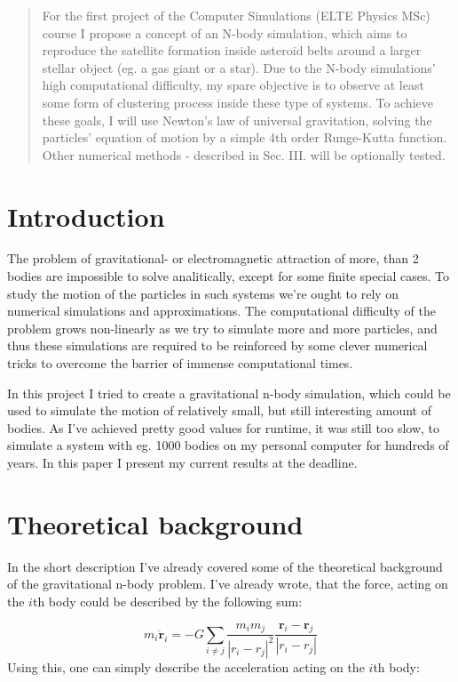 \begin{abstract}
    \noindent For the first project of the Computer Simulations (ELTE Physics MSc) course I propose a concept of an N-body simulation, which aims to reproduce the satellite formation inside asteroid belts around a larger stellar object (eg. a gas giant or a star). Due to the N-body simulations' high computational difficulty, my spare objective is to observe at least some form of clustering process inside these type of systems. To achieve these goals, I will use Newton's law of universal gravitation, solving the particles' equation of motion by a simple 4th order Runge-Kutta function. Other numerical methods - described in Sec. III. will be optionally tested.
\end{abstract}

\begin{multicols}{2}
\section{Introduction}
The problem of gravitational- or electromagnetic attraction of more, than 2 bodies are impossible to solve analitically, except for some finite special cases. To study the motion of the particles in such systems we're ought to rely on numerical simulations and approximations. The computational difficulty of the problem grows non-linearly as we try to simulate more and more particles, and thus these simulations are required to be reinforced by some clever numerical tricks to overcome the barrier of immense computational times. \par
In this project I tried to create a gravitational n-body simulation, which could be used to simulate the motion of relatively small, but still interesting amount of bodies. As I've achieved pretty good values for runtime, it was still too slow, to simulate a system with eg. 1000 bodies on my personal computer for hundreds of years. In this paper I present my current results at the deadline.

\section{Theoretical background}
In the short description I've already covered some of the theoretical background of the gravitational n-body problem. I've already wrote, that the force, acting on the $i$th body could be described by the following sum:

\begin{equation} \label{eq:1}
m_{i} \boldsymbol{\ddot{r}}_{i}
=
- G \sum_{i \neq j} \frac{m_{i} m_{j}}{\left| r_{i} - r_{j} \right|^{2}} \frac{\boldsymbol{r}_{i} - \boldsymbol{r}_{j}}{\left| r_{i} - r_{j} \right|}
\end{equation}
Using this, one can simply describe the acceleration acting on the $i$th body:


\end{multicols}
